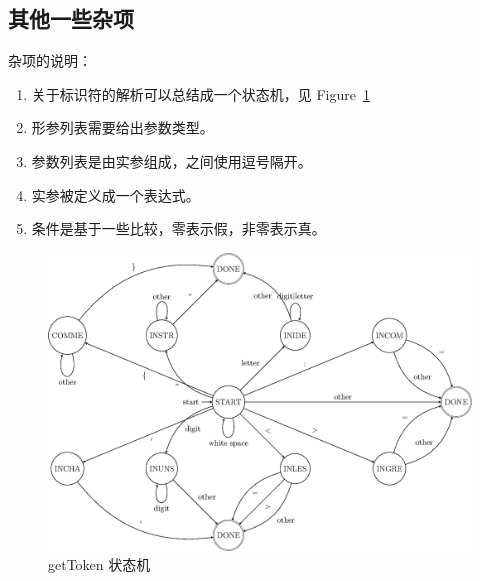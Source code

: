 \subsection{其他一些杂项}









杂项的说明：
\begin{enumerate}
	\item 关于标识符的解析可以总结成一个状态机，见 Figure~\ref{getToken}
	\item 形参列表需要给出参数类型。
	\item 参数列表是由实参组成，之间使用逗号隔开。
	\item 实参被定义成一个表达式。
	\item 条件是基于一些比较，零表示假，非零表示真。
\end{enumerate}
\begin{figure}[!h]
\begin{center}
    \includegraphics[scale=.8]{Figures/getToken.eps}
\end{center}
\caption{getToken 状态机}
\label{getToken}
\end{figure}

